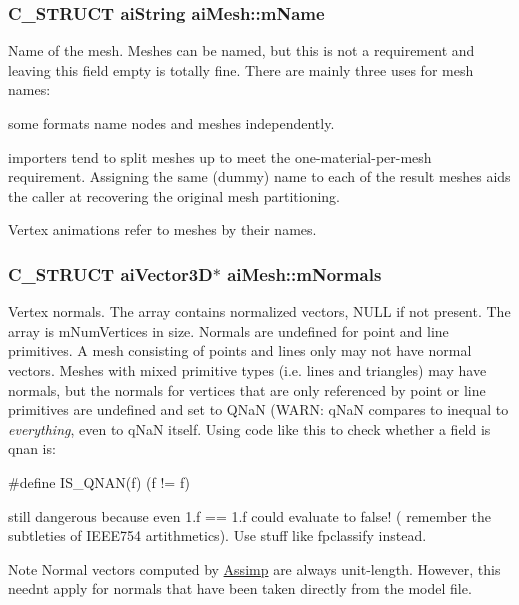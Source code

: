 \subsubsection[{\texorpdfstring{m\+Name}{mName}}]{\setlength{\rightskip}{0pt plus 5cm}C\+\_\+\+S\+T\+R\+U\+CT {\bf ai\+String} ai\+Mesh\+::m\+Name}\hypertarget{structai_mesh_a8dd9433e0c5b008e3e5aee6c801d3b74}{}\label{structai_mesh_a8dd9433e0c5b008e3e5aee6c801d3b74}
Name of the mesh. Meshes can be named, but this is not a requirement and leaving this field empty is totally fine. There are mainly three uses for mesh names\+:
\begin{DoxyItemize}
\item some formats name nodes and meshes independently.
\item importers tend to split meshes up to meet the one-\/material-\/per-\/mesh requirement. Assigning the same (dummy) name to each of the result meshes aids the caller at recovering the original mesh partitioning.
\item Vertex animations refer to meshes by their names. 
\end{DoxyItemize}
\subsubsection[{\texorpdfstring{m\+Normals}{mNormals}}]{\setlength{\rightskip}{0pt plus 5cm}C\+\_\+\+S\+T\+R\+U\+CT {\bf ai\+Vector3D}$\ast$ ai\+Mesh\+::m\+Normals}\hypertarget{structai_mesh_aec81b496b4d93838cef038933dabe9b9}{}\label{structai_mesh_aec81b496b4d93838cef038933dabe9b9}
Vertex normals. The array contains normalized vectors, N\+U\+LL if not present. The array is m\+Num\+Vertices in size. Normals are undefined for point and line primitives. A mesh consisting of points and lines only may not have normal vectors. Meshes with mixed primitive types (i.\+e. lines and triangles) may have normals, but the normals for vertices that are only referenced by point or line primitives are undefined and set to Q\+NaN (W\+A\+RN\+: q\+NaN compares to inequal to {\itshape everything}, even to q\+NaN itself. Using code like this to check whether a field is qnan is\+: 
\begin{DoxyCode}
\textcolor{preprocessor}{#define IS\_QNAN(f) (f != f)}
\end{DoxyCode}
 still dangerous because even 1.\+f == 1.\+f could evaluate to false! ( remember the subtleties of I\+E\+E\+E754 artithmetics). Use stuff like {\ttfamily fpclassify} instead. \begin{DoxyNote}{Note}
Normal vectors computed by \hyperlink{namespace_assimp}{Assimp} are always unit-\/length. However, this needn\textquotesingle{}t apply for normals that have been taken directly from the model file. 
\end{DoxyNote}
